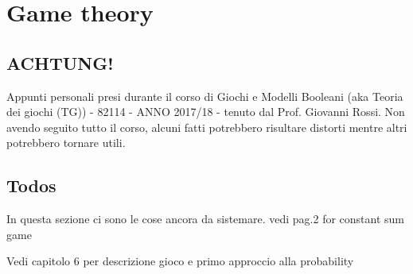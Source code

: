 \chapter{Game theory}

\section{ACHTUNG!}

Appunti personali presi durante il corso di Giochi e Modelli Booleani (aka Teoria dei giochi (TG)) - 82114 - ANNO 2017/18 - tenuto dal Prof. Giovanni Rossi. Non avendo seguito tutto il corso, alcuni fatti potrebbero risultare distorti mentre altri potrebbero tornare utili.

\section{Todos}
In questa sezione ci sono le cose ancora da sistemare.
vedi \cite{vorobev01} pag.2 for constant sum game

Vedi capitolo 6 per descrizione gioco e primo approccio alla probability






























